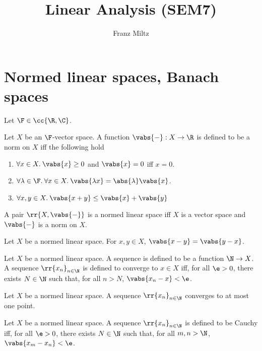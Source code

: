 \documentclass{article}
\begin{document}
\mkthmstwounified
\title{Linear Analysis (SEM7)}
\author{Franz Miltz}
\maketitle
\tableofcontents
\pagebreak

\section{Normed linear spaces, Banach spaces}
\label{sec:definitions}

Let $\F\in \cc{\R,\C}$.

\begin{definition}
  \label{def:nls}
  Let $X$ be an $\F$-vector space.
  A function $ \vabs{-} : X \to \R$ is defined to be a norm on $X$ iff the following hold
  \begin{enumerate}
    \item $\forall x\in X.\: \vabs{x}\geq 0$ and $ \vabs{x} = 0$ iff $x = 0$.
    \item $\forall \lambda\in\F.\:\forall x \in X.\: \vabs{\lambda x} = \abs{\lambda} \vabs{x}$.
    \item $\forall x,y\in X.\: \vabs{x + y} \leq \vabs{x} + \vabs{y}$
  \end{enumerate}
  A pair $ \rr{X, \vabs{-}}$ is a normed linear space iff $X$ is a vector space and $ \vabs{-} $
  is a norm on $X$.
\end{definition}


\begin{theorem}
  \label{thm:symmetry}
  Let $X$ be a normed linear space. For $x,y\in X$, $ \vabs{x - y} = \vabs{y - x} $.
\end{theorem}


\begin{definition}
  \label{def:convergence}
  Let $X$ be a normed linear space. A sequence is defined to be a function $\N\to X$. A
  sequence $ \rr{x_n}_{n\in\N}$ is defined to converge to $x\in X$ iff, for all $\e > 0$,
  there exists $N\in\N$ such that, for all $n>N$, $ \vabs{x_n - x} < \e$.
\end{definition}


\begin{theorem}
  \label{thm:uniquenes-of-the-limit}
  Let $X$ be a normed linear space. A sequence $ \rr{x_n}_{n\in\N}$ converges to at most one point.
\end{theorem}


\begin{definition}
  \label{def:cauchy}
  Let $X$ be a normed linear space. A sequence $ \rr{x_n}_{n\in\N}$ is defined to be Cauchy iff,
  for all $\e>0$, there exists $N\in\N$ such that, for all $m,n>\N$, $ \vabs{x_m - x_n} < \e$.
\end{definition}
\end{document}
